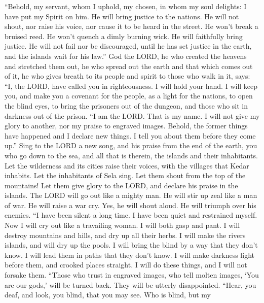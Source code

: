  ``Behold, my servant, whom I uphold, my chosen, in whom my
soul delights: I have put my Spirit on him. He will bring justice to the
nations.  He will not shout, nor raise his voice, nor cause
it to be heard in the street.  He won't break a bruised
reed. He won't quench a dimly burning wick. He will faithfully bring
justice.  He will not fail nor be discouraged, until he has
set justice in the earth, and the islands wait for his law.''
 God the LORD, he who created the heavens and stretched them
out, he who spread out the earth and that which comes out of it, he who
gives breath to its people and spirit to those who walk in it, says:
 ``I, the LORD, have called you in righteousness. I will
hold your hand. I will keep you, and make you a covenant for the people,
as a light for the nations,  to open the blind eyes, to
bring the prisoners out of the dungeon, and those who sit in darkness
out of the prison.  ``I am the LORD. That is my name. I will
not give my glory to another, nor my praise to engraved images.
 Behold, the former things have happened and I declare new
things. I tell you about them before they come up.''  Sing
to the LORD a new song, and his praise from the end of the earth, you
who go down to the sea, and all that is therein, the islands and their
inhabitants.  Let the wilderness and its cities raise their
voices, with the villages that Kedar inhabits. Let the inhabitants of
Sela sing. Let them shout from the top of the mountains! 
Let them give glory to the LORD, and declare his praise in the islands.
 The LORD will go out like a mighty man. He will stir up
zeal like a man of war. He will raise a war cry. Yes, he will shout
aloud. He will triumph over his enemies.  ``I have been
silent a long time. I have been quiet and restrained myself. Now I will
cry out like a travailing woman. I will both gasp and pant.
 I will destroy mountains and hills, and dry up all their
herbs. I will make the rivers islands, and will dry up the pools.
 I will bring the blind by a way that they don't know. I
will lead them in paths that they don't know. I will make darkness light
before them, and crooked places straight. I will do these things, and I
will not forsake them.  ``Those who trust in engraved
images, who tell molten images, `You are our gods,' will be turned back.
They will be utterly disappointed.  ``Hear, you deaf, and
look, you blind, that you may see.  Who is blind, but my
